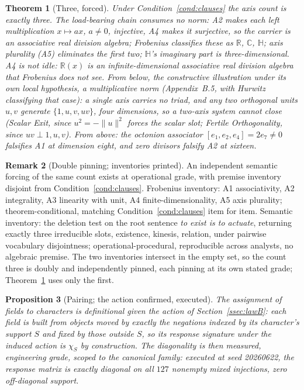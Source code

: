 \documentclass[twocolumn,10pt]{article}
\theoremstyle{plain}
\newtheorem{theorem}{Theorem}[section]
\newtheorem{proposition}[theorem]{Proposition}
\theoremstyle{definition}
\newtheorem{remark}[theorem]{Remark}
\newcommand{\Rl}{\mathbb{R}}
\newcommand{\Hq}{\mathbb{H}}
\begin{document}
\begin{theorem}[Three, forced]\label{thm:three}
Under Condition~\ref{cond:clauses} the axis count is exactly three. The load-bearing chain consumes no norm: A2 makes each left multiplication $x\mapsto ax$, $a\ne0$, injective, A4 makes it surjective, so the carrier is an associative real division algebra; Frobenius \cite{Frobenius1878} classifies these as $\Rl$, $\mathbb C$, $\Hq$; axis plurality (A5) eliminates the first two; $\Hq$'s imaginary part is three-dimensional. A4 is not idle: $\Rl(x)$ is an infinite-dimensional associative real division algebra that Frobenius does not see. From below, the constructive illustration under its own local hypothesis, a multiplicative norm (Appendix~B.5, with Hurwitz \cite{Hurwitz1898} classifying that case): a single axis carries no triad, and any two orthogonal units $u,v$ generate $\{1,u,v,uv\}$, four dimensions, so a two-axis system cannot close (Scalar Exit, since $u^2=-\lVert u\rVert^2$ forces the scalar slot; Fertile Orthogonality, since $uv\perp 1,u,v$). From above: the octonion associator $[e_1,e_2,e_4]=2e_7\ne0$ falsifies A1 at dimension eight, and zero divisors falsify A2 at sixteen.
\end{theorem}

\begin{remark}[Double pinning; inventories printed]\label{rem:double}
An independent semantic forcing of the same count exists at operational grade, with premise inventory disjoint from Condition~\ref{cond:clauses}. Frobenius inventory: A1 associativity, A2 integrality, A3 linearity with unit, A4 finite-dimensionality, A5 axis plurality; theorem-conditional, matching Condition~\ref{cond:clauses} item for item. Semantic inventory: the deletion test on the root sentence \emph{to exist is to actuate}, returning exactly three irreducible slots, existence, kinesis, relation, under pairwise vocabulary disjointness; operational-procedural, reproducible across analysts, no algebraic premise. The two inventories intersect in the empty set, so the count three is doubly and independently pinned, each pinning at its own stated grade; Theorem~\ref{thm:three} uses only the first.
\end{remark}

\begin{proposition}[Pairing; the action confirmed, executed]\label{prop:pairing}
The assignment of fields to characters is definitional given the action of Section~\ref{ssec:lawB}: each field is built from objects moved by exactly the negations indexed by its character's support $S$ and fixed by those outside $S$, so its response signature under the induced action is $\chi_S$ by construction. The diagonality is then measured, engineering grade, scoped to the canonical family: executed at seed 20260622, the response matrix is exactly diagonal on all $127$ nonempty mixed injections, zero off-diagonal support.
\end{proposition}
\end{document}
